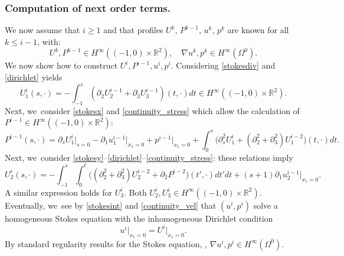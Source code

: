 \documentclass[JEP,XML,SOM,Unicode,NoEqCountersInSection,published]{cedram}
\theoremstyle{plain}
\theoremstyle{definition}
\let\pa\partial
\let\na\nabla
\newcommand{\R}{\mathbb{R}}
\begin{document}
\subsubsection*{Computation of next order terms.} We now assume that $i \ge 1$ and that profiles $U^k$, $P^{k-1}$, $u^k$, $p^k$ are known for all $k \le i-1$, with:
\[
U^k, P^{k-1} \in H^\infty((-1,0) \times \R^2), \quad \na u^k, p^k \in H^\infty(\Omega^0).
\]
We now show how to construct $U^i,P^{i-1}, u^i, p^i$. Considering \eqref{stokesdiv} and \eqref{dirichlet} yields
\[
U^i_1(s,\cdot) = - \int_{-1}^s (\pa_2 U^{i-1}_2 + \pa_3 U^{i-1}_3)(t,\cdot) dt \in H^\infty((-1,0) \times \R^2).
\]
Next, we~consider \eqref{stokesx} and \eqref{continuity_stress} which allow the calculation of \hbox{$P^{i-1} \!\!\in\! H^\infty(\!({-}1,0)\!\times\! \R^2)$}:
\[
P^{i-1}(s,\cdot) = \pa_s U^i_1\vert_{s=0} - \pa_1 u^{i-1}_1\vert_{x_1=0} + p^{i-1}\vert_{x_1=0}
+ \int_0^s \big(\pa^2_s U^i_1 + (\pa^2_2 + \pa^2_3) U^{i-2}_1 \big)(t,\cdot) dt.
\]
Next, we~consider \eqref{stokesy}--\eqref{dirichlet}--\eqref{continuity_stress}: these relations imply
\[
U^i_2(s,\cdot) = - \int_{-1}^s \int_{0}^t \Big((\pa^2_2 + \pa^2_3) U^{i-2}_2 + \pa_2 P^{i-2} \Big)(t',\cdot) dt' dt + (s+1) \pa_1 u^{i-1}_2\vert_{x_1=0}.
\]
A similar expression holds for $U^i_3$. Both $U^i_2, U^i_3 \in H^\infty((-1,0) \times \R^2)$. Eventually, we~see by \eqref{stokesint} and \eqref{continuity_vel} that $(u^i,p^i)$ solve a homogeneous Stokes equation with the inhomogeneous Dirichlet condition
\[
u^i\vert_{x_1=0} = U^i\vert_{x_1=0}.
\]
By standard regularity results for the Stokes equation, \cf
\cite[Th.\,IV.3.2 \& IV.3.3]{Galdi}, $\na u^i, p^i \in H^\infty(\Omega^0)$.
\end{document}
